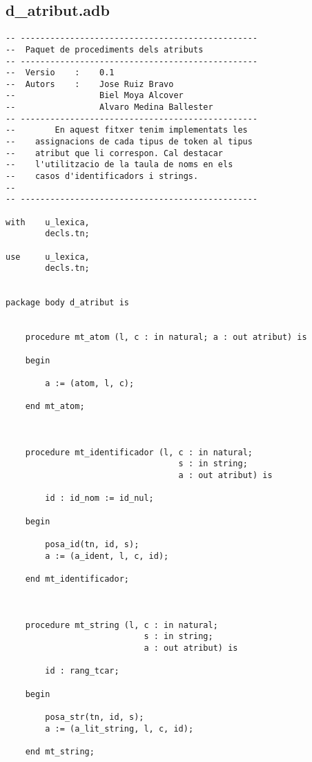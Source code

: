 \documentclass[10pt]{report}
\begin{document}
    \newpage
    
    \subsection{d\_atribut.adb}
    \begin{lstlisting}[style=Ada]
-- ------------------------------------------------
--  Paquet de procediments dels atributs
-- ------------------------------------------------
--  Versio    :    0.1
--  Autors    :    Jose Ruiz Bravo
--                 Biel Moya Alcover
--                 Alvaro Medina Ballester
-- ------------------------------------------------
--        En aquest fitxer tenim implementats les 
--    assignacions de cada tipus de token al tipus
--    atribut que li correspon. Cal destacar 
--    l'utilitzacio de la taula de noms en els
--    casos d'identificadors i strings.
--
-- ------------------------------------------------

with    u_lexica,
        decls.tn;

use     u_lexica,
        decls.tn;
        

package body d_atribut is    
    
    
    procedure mt_atom (l, c : in natural; a : out atribut) is
    
    begin
    
        a := (atom, l, c);
        
    end mt_atom;
    
    
    
    procedure mt_identificador (l, c : in natural; 
                                   s : in string; 
                                   a : out atribut) is
    
        id : id_nom := id_nul;
        
    begin
    
        posa_id(tn, id, s);
        a := (a_ident, l, c, id);
        
    end mt_identificador;
    
    
    
    procedure mt_string (l, c : in natural; 
                            s : in string; 
                            a : out atribut) is
    
        id : rang_tcar;
        
    begin
    
        posa_str(tn, id, s);
        a := (a_lit_string, l, c, id);
        
    end mt_string;
    

\end{lstlisting}
\end{document}
